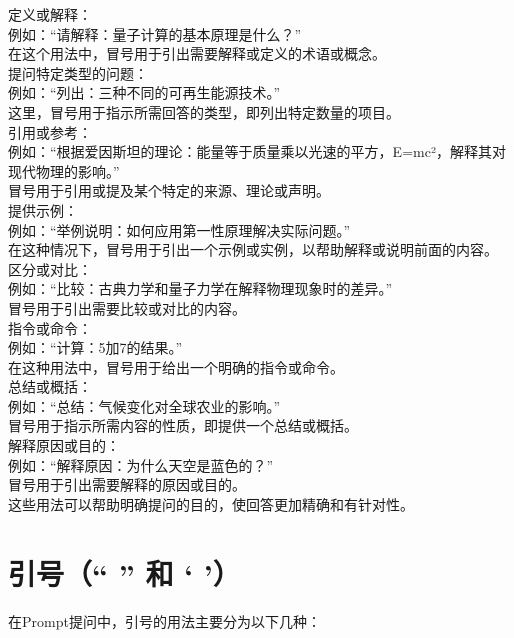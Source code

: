 \documentclass[12pt]{book}
\begin{document}
定义或解释：\\
例如：“请解释：量子计算的基本原理是什么？”\\
在这个用法中，冒号用于引出需要解释或定义的术语或概念。\\
提问特定类型的问题：\\
例如：“列出：三种不同的可再生能源技术。”\\
这里，冒号用于指示所需回答的类型，即列出特定数量的项目。\\
引用或参考：\\
例如：“根据爱因斯坦的理论：能量等于质量乘以光速的平方，E=mc²，解释其对现代物理的影响。”\\
冒号用于引用或提及某个特定的来源、理论或声明。\\
提供示例：\\
例如：“举例说明：如何应用第一性原理解决实际问题。”\\
在这种情况下，冒号用于引出一个示例或实例，以帮助解释或说明前面的内容。\\
区分或对比：\\
例如：“比较：古典力学和量子力学在解释物理现象时的差异。”\\
冒号用于引出需要比较或对比的内容。\\
指令或命令：\\
例如：“计算：5加7的结果。”\\
在这种用法中，冒号用于给出一个明确的指令或命令。\\
总结或概括：\\
例如：“总结：气候变化对全球农业的影响。”\\
冒号用于指示所需内容的性质，即提供一个总结或概括。\\
解释原因或目的：\\
例如：“解释原因：为什么天空是蓝色的？”\\
冒号用于引出需要解释的原因或目的。\\
这些用法可以帮助明确提问的目的，使回答更加精确和有针对性。\\

\section{引号（“ ” 和 ‘ ’）}
在Prompt提问中，引号的用法主要分为以下几种：\\
\end{document}
